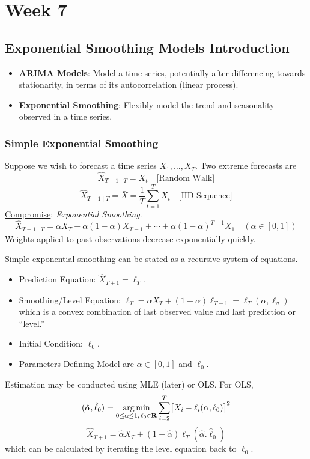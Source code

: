 \chapter{Week 7}
\section{Exponential Smoothing Models Introduction}
\begin{itemize}
      \item \textbf{ARIMA Models}: Model a time series, potentially after differencing towards
            stationarity, in terms of its autocorrelation (linear process).
      \item \textbf{Exponential Smoothing}: Flexibly model the trend and seasonality
            observed in a time series.
\end{itemize}
\subsection*{Simple Exponential Smoothing}
Suppose we wish to forecast a time series $ X_1,\ldots,X_T $. Two extreme
forecasts are
\[ \hat{X}_{T+1\mid T}=X_t\quad\text{[Random Walk]} \]
\[ \hat{X}_{T+1\mid T}=\bar{X}=\frac{1}{T} \sum_{t=1}^{T} X_t \quad\text{[IID Sequence]} \]
\underline{Compromise}: \emph{Exponential Smoothing}.
\[ \hat{X}_{T+1\mid T}=\alpha X_T+\alpha(1-\alpha)X_{T-1}+\cdots+\alpha(1-\alpha)^{T-1}X_1\quad(\alpha\in[0,1]) \]
Weights applied to past observations decrease exponentially quickly.

Simple exponential smoothing can be stated as a recursive system of equations.
\begin{itemize}
      \item Prediction Equation: $ \hat{X}_{T+1}=\ell_T $.
      \item Smoothing/Level Equation: $ \ell_T=\alpha X_T+(1-\alpha)\ell_{T-1}=\ell_T(\alpha,\ell_\sigma) $
            which is a convex combination of last observed value and last prediction or ``level.''
      \item Initial Condition: $ \ell_0 $.
      \item Parameters Defining Model are $ \alpha\in[0,1] $ and $ \ell_0 $.
\end{itemize}
Estimation may be conducted using MLE (later) or OLS\@. For OLS,
\[ (\hat{\alpha},\hat{\ell}_0)=\operatorname*{arg\,min}_{0\le \alpha\le 1,\,\ell_0\in\mathbf{R}}
      \sum_{i=2}^{T} \bigl[X_i-\ell_i(\alpha,\ell_0)\bigr]^2 \]
\[ \hat{X}_{T+1}=\hat{\alpha}X_T+(1-\hat{\alpha})\ell_T(\hat{\alpha}.\hat{\ell}_0) \]
which can be calculated by iterating the level equation back to $ \ell_0 $.

